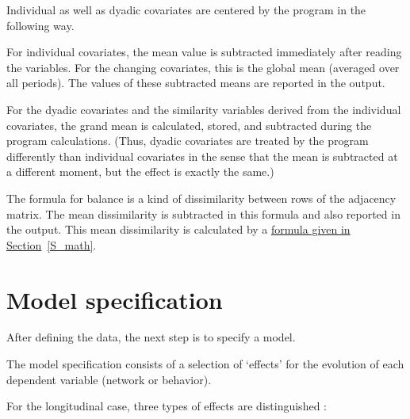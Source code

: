 \documentclass[a4paper,fleqn]{article}
\newcommand{\+}{\, + \,}
\newcommand{\SI}{{\sf SIENA }}
\begin{document}
{Individual as well as dyadic covariates are
\hypertarget{T_S_centering}{centered}
by the program in the following way.

For individual covariates, the mean value is subtracted
immediately after reading the variables. For the changing
covariates, this is the global mean (averaged over all periods).
The values of these subtracted means are reported in the output.

For the dyadic covariates and the similarity variables derived
from the individual covariates, the grand mean is calculated,
stored, and subtracted during the program calculations. (Thus,
dyadic covariates are treated by the program differently than
individual covariates in the sense that the mean is subtracted at
a different moment, but the effect is exactly the same.)

The formula for balance is a kind of dissimilarity between rows of
the adjacency matrix. The mean dissimilarity is subtracted in this
formula and also reported in the output. This mean dissimilarity
is calculated by a
\hyperlink{T_meanbal}{formula given in Section}~\ref{S_math}.


\begin{print}
\newpage
\end{print}
\section{Model specification}
\label{S_modspec}

After defining the data, the next step is to specify a model.\medskip

The model specification consists of a selection of `effects' for
the evolution of each dependent variable (network or behavior).

For the longitudinal case, three types of
effects are distinguished \citep*[see][]{Snijders01, SnijdersEA10b}:

}
\end{document}
